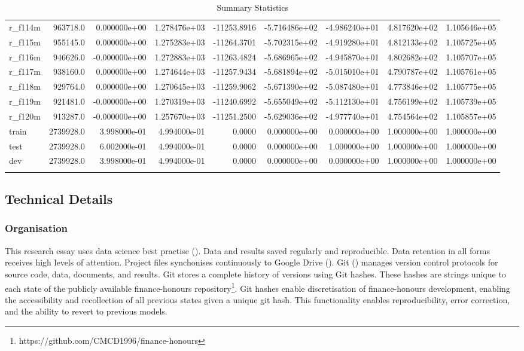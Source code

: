 \documentclass[12pt]{article}
\begin{document}
\begin{landscape}
\begin{longtable}{|l|r|r|r|r|r|r|r|r|}
r\_f114m                 &   963718.0 &  0.000000e+00 &  1.278476e+03 & -11253.8916 & -5.716486e+02 & -4.986240e+01 &  4.817620e+02 &  1.105646e+05 \\
r\_f115m                 &   955145.0 &  0.000000e+00 &  1.275283e+03 & -11264.3701 & -5.702315e+02 & -4.919280e+01 &  4.812133e+02 &  1.105725e+05 \\
r\_f116m                 &   946626.0 & -0.000000e+00 &  1.272883e+03 & -11263.4824 & -5.686965e+02 & -4.945870e+01 &  4.802682e+02 &  1.105707e+05 \\
r\_f117m                 &   938160.0 &  0.000000e+00 &  1.274644e+03 & -11257.9434 & -5.681894e+02 & -5.015010e+01 &  4.790787e+02 &  1.105761e+05 \\
r\_f118m                 &   929764.0 &  0.000000e+00 &  1.270645e+03 & -11259.9062 & -5.671390e+02 & -5.087480e+01 &  4.773846e+02 &  1.105775e+05 \\
r\_f119m                 &   921481.0 & -0.000000e+00 &  1.270319e+03 & -11240.6992 & -5.655049e+02 & -5.112130e+01 &  4.756199e+02 &  1.105739e+05 \\
r\_f120m                 &   913287.0 & -0.000000e+00 &  1.257670e+03 & -11251.2500 & -5.629036e+02 & -4.977740e+01 &  4.754564e+02 &  1.105857e+05 \\
train                   &  2739928.0 &  3.998000e-01 &  4.994000e-01 &      0.0000 &  0.000000e+00 &  0.000000e+00 &  1.000000e+00 &  1.000000e+00 \\
test                    &  2739928.0 &  6.002000e-01 &  4.994000e-01 &      0.0000 &  0.000000e+00 &  1.000000e+00 &  1.000000e+00 &  1.000000e+00 \\
dev                     &  2739928.0 &  3.998000e-01 &  4.994000e-01 &      0.0000 &  0.000000e+00 &  0.000000e+00 &  1.000000e+00 &  1.000000e+00 \\
\bottomrule
\caption{Summary Statistics}
\label{table:ss}
\end{longtable}
\end{landscape}
\subsection{Technical Details}
\subsubsection{Organisation}
This research essay uses data science best practise (\cite{J:10}).
Data and results saved regularly and reproducible. 
Data retention in all forms receives high levels of attention. 
Project files synchonises continuously to Google Drive (\cite{Google_Drive}). 
Git (\cite{Git}) manages version control protocols for source code, data, documents, and results.
Git stores a complete history of versions using Git hashes. 
These hashes are strings unique to each state of the publicly available finance-honours repository\footnote[1]{https://github.com/CMCD1996/finance-honours}. 
Git hashes enable discretisation of finance-honours development, enabling the accessibility and recollection of all previous states given a unique git hash. 
This functionality enables reproducibility, error correction, and the ability to revert to previous models.
\end{document}
